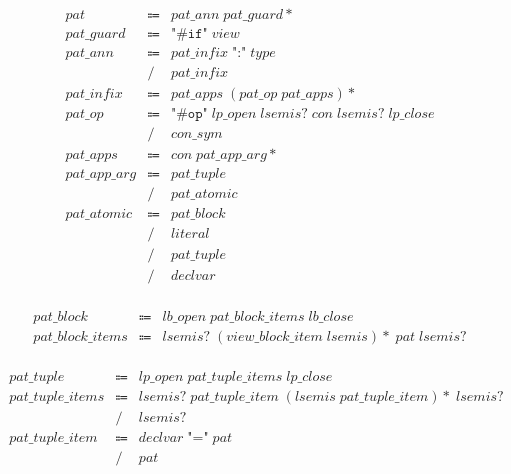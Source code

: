 \begin{align*}
    \begin{array}{rcll}
        \mathit{pat}
        &\Coloneq &\mathit{pat\_ann}\; \mathit{pat\_guard}{*} \\
        \mathit{pat\_guard}
        &\Coloneq &\texttt{"\#if"}\; \mathit{view} \\
        \mathit{pat\_ann}
        &\Coloneq &\mathit{pat\_infix}\; \texttt{":"}\; \mathit{type} \\
        &\mathrel{/} &\mathit{pat\_infix} \\
        \mathit{pat\_infix}
        &\Coloneq &\mathit{pat\_apps}\; (\mathit{pat\_op}\; \mathit{pat\_apps}){*} \\
        \mathit{pat\_op}
        &\Coloneq &\texttt{"\#op"}\; \mathit{lp\_open}\; \mathit{lsemis}{?}\; \mathit{con}\; \mathit{lsemis}{?}\; \mathit{lp\_close} \\
        &\mathrel{/} &\mathit{con\_sym} \\
        \mathit{pat\_apps}
        &\Coloneq &\mathit{con}\; \mathit{pat\_app\_arg}{*} \\
        \mathit{pat\_app\_arg}
        &\Coloneq &\mathit{pat\_tuple} \\
        &\mathrel{/} &\mathit{pat\_atomic} \\
        \mathit{pat\_atomic}
        &\Coloneq &\mathit{pat\_block} \\
        &\mathrel{/} &\mathit{literal} \\
        &\mathrel{/} &\mathit{pat\_tuple} \\
        &\mathrel{/} &\mathit{declvar}
    \end{array}
\end{align*}

\begin{align*}
    \begin{array}{rcll}
        \mathit{pat\_block}
        &\Coloneq &\mathit{lb\_open}\; \mathit{pat\_block\_items}\; \mathit{lb\_close} \\
        \mathit{pat\_block\_items}
        &\Coloneq &\mathit{lsemis}{?}\; (\mathit{view\_block\_item}\; \mathit{lsemis}){*}\; \mathit{pat}\; \mathit{lsemis}{?}
    \end{array}
\end{align*}

\begin{align*}
    \begin{array}{rcll}
        \mathit{pat\_tuple}
        &\Coloneq &\mathit{lp\_open}\; \mathit{pat\_tuple\_items}\; \mathit{lp\_close} \\
        \mathit{pat\_tuple\_items}
        &\Coloneq &\mathit{lsemis}{?}\; \mathit{pat\_tuple\_item}\; (\mathit{lsemis}\; \mathit{pat\_tuple\_item}){*}\; \mathit{lsemis}{?} \\
        &\mathrel{/} &\mathit{lsemis}{?} \\
        \mathit{pat\_tuple\_item}
        &\Coloneq &\mathit{declvar}\; \texttt{"="}\; \mathit{pat} \\
        &\mathrel{/} &\mathit{pat}
    \end{array}
\end{align*}

